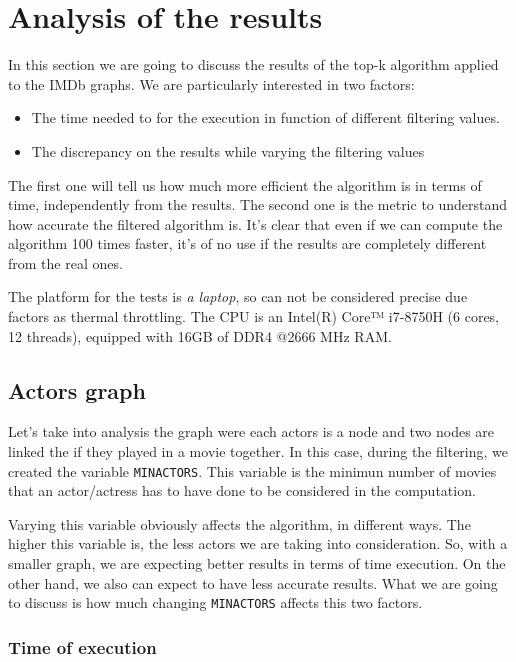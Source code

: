 \section{Analysis of the results}

In this section we are going to discuss the results of the top-k algorithm applied to the IMDb graphs. We are particularly interested in two factors:
\begin{itemize}
    \item The time needed to for the execution in function of different filtering values.
    \item The discrepancy on the results while varying the filtering values
\end{itemize}
The first one will tell us how much more efficient the algorithm is in terms of time, independently from the results. The second one is the metric to understand how accurate the filtered algorithm is. It's clear that even if we can compute the algorithm 100 times faster, it's of no use if the results are completely different from the real ones.\s

\nd The platform for the tests is \emph{a laptop}, so can not be considered precise due factors as thermal throttling. The CPU is an Intel(R) Core™ i7-8750H (6 cores, 12 threads), equipped with 16GB of DDR4 @2666 MHz RAM.

\subsection{Actors graph} \label{actors-graph}
Let's take into analysis the graph were each actors is a node and two nodes are linked the if they played in a movie together. In this case, during the filtering, we created the variable \texttt{MIN\textunderscore ACTORS}. This variable is the minimun number of movies that an actor/actress has to have done to be considered in the computation. \s

\nd Varying this variable obviously affects the algorithm, in different ways. The higher this variable is, the less actors we are taking into consideration. So, with a smaller graph, we are expecting better results in terms of time execution. On the other hand, we also can expect to have less accurate results. What we are going to discuss is how much changing \texttt{MIN\textunderscore ACTORS} affects this two factors.

\subsubsection{Time of execution} \label{time-actors}

